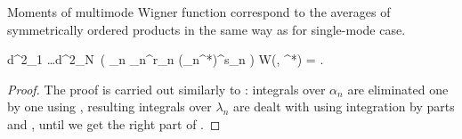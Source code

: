 Moments of multimode Wigner function correspond to the averages of symmetrically ordered products in the same way as for single-mode case.

\begin{theorem}
	\begin{eqn*}
		\int d^2\alpha_1 \ldots \int d^2\alpha_N\,
			\left(
				\prod_n \alpha_n^{r_n} (\alpha_n^*)^{s_n}
			\right) W(\balpha, \balpha^*)
		= \langle {} \rangle.
	\end{eqn*}
\end{theorem}
\begin{proof}
The proof is carried out similarly to : integrals over $\alpha_n$ are eliminated one by one using , resulting integrals over $\lambda_n$ are dealt with using integration by parts and , until we get the right part of .
\end{proof}
